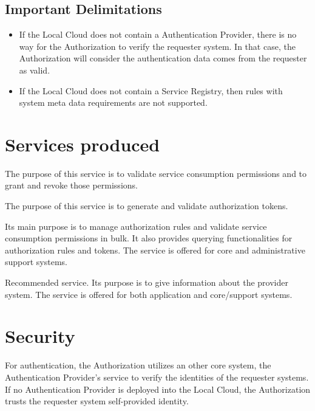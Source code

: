 \documentclass[a4paper]{arrowhead}
\begin{document}
\subsection{Important Delimitations}
\label{sec:delimitations}

\begin{itemize}
    \item  If the Local Cloud does not contain a Authentication Provider, there is no way for the Authorization to verify the requester system. In that case, the Authorization will consider the authentication data comes from the requester as valid.
    \item If the Local Cloud does not contain a Service Registry, then rules with system meta data requirements are not supported.
\end{itemize}

\newpage

\section{Services produced}
\label{sec:services}

The purpose of this service is to validate service consumption permissions and to grant and revoke those permissions.

The purpose of this service is to generate and validate authorization tokens.

Its main purpose is to manage authorization rules and validate service consumption permissions in bulk. It also provides querying functionalities for authorization rules and tokens. The service is offered for core and administrative support systems.  

Recommended service. Its purpose is to give information about the provider system. The service is offered for both application and core/support systems.

\newpage

\section{Security}
\label{sec:security}

For authentication, the Authorization utilizes an other core system, the Authentication Provider's service to verify the identities of the requester systems. If no Authentication Provider is deployed into the Local Cloud, the Authorization trusts the requester system self-provided identity.
\end{document}
